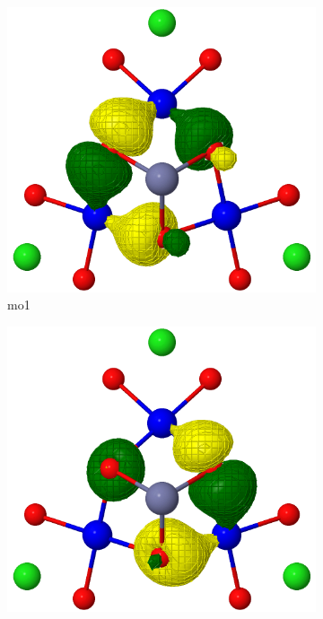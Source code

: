 \documentclass[12pt]{report}
\numberwithin{equation}{section}
\begin{document}
\begin{figure}
	\centering
	\begin{subfigure}{0.3\linewidth}
		\includegraphics[width=\linewidth]{Images/mo1.trimer.png}
		\caption{mo1}
		\label{fig:subfigA}
	\end{subfigure}
	\begin{subfigure}{0.3\linewidth}
		\includegraphics[width=\linewidth]{Images/mo2.trimer.png}

\end{subfigure}
\end{figure}
\end{document}
